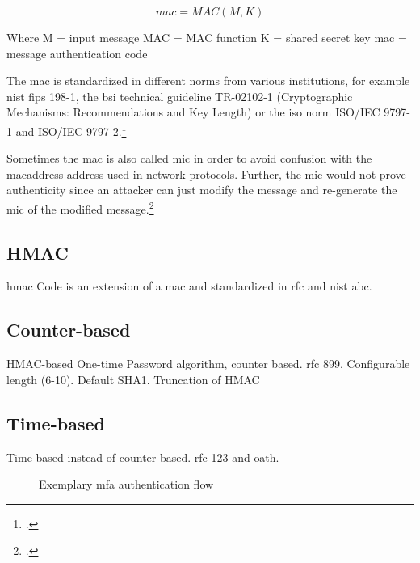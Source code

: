 \begin{equation*}
  	mac = MAC(M, K)
\end{equation*}

Where M = input message
MAC = MAC function
K = shared secret key
mac = message authentication code


The \gls{mac} is standardized in different norms from various institutions, for example \gls{nist} \gls{fips} 198-1, the \gls{bsi} technical guideline TR-02102-1 (\frqq Cryptographic Mechanisms: Recommendations and Key Length\flqq{}) or the \gls{iso} norm ISO/IEC 9797-1 and ISO/IEC 9797-2.\footcites[See][]{FIPS198}[See][]{bsi2019recommendations}[See][]{iso9797-1}[See][]{iso9797-2}

Sometimes the \gls{mac} is also called \gls{mic} in order to avoid confusion with the \gls{macaddress} address used in network protocols. Further, the \gls{mic} would not prove authenticity since an attacker can just modify the message and re-generate the \gls{mic} of the modified message.\footcites[See][60-62]{265831}

\subsection{HMAC}

\gls{hmac} Code is an extension of a \gls{mac} and standardized in \gls{rfc} and \gls{nist} abc.
\cite{krawczyk1997rfc}

\subsection{Counter-based}
\label{subsec:hotp}

HMAC-based One-time Password algorithm, counter based. \gls{rfc} 899. Configurable length (6-10). Default SHA1. Truncation of HMAC
\cite{m2005rfc}

\subsection{Time-based}
\label{subsec:totp}

Time based instead of counter based. \gls{rfc} 123 and \gls{oath}.
\cite{m2011rfc}

\begin{figure}[hbt]
	\centering
	
	\caption[Exemplary \gls{mfa} authentication flow]{Exemplary \gls{mfa} authentication flow\footnotemark}
	\label{fig:2fa_flow}
\end{figure}

